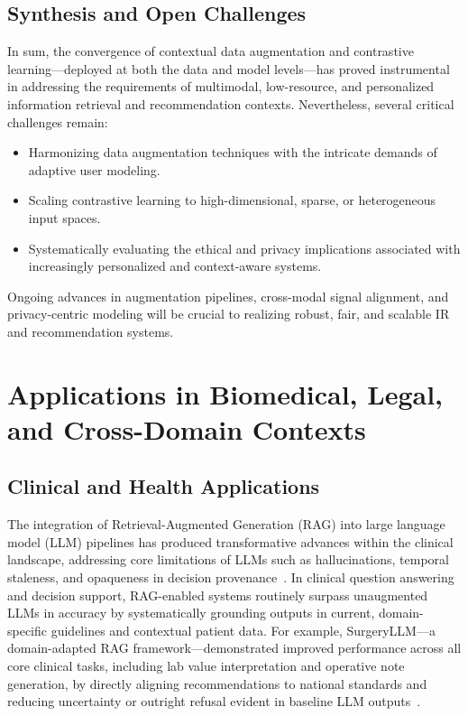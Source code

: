\subsection{Synthesis and Open Challenges}

In sum, the convergence of contextual data augmentation and contrastive learning—deployed at both the data and model levels—has proved instrumental in addressing the requirements of multimodal, low-resource, and personalized information retrieval and recommendation contexts. Nevertheless, several critical challenges remain:

\begin{itemize}
    \item Harmonizing data augmentation techniques with the intricate demands of adaptive user modeling.
    \item Scaling contrastive learning to high-dimensional, sparse, or heterogeneous input spaces.
    \item Systematically evaluating the ethical and privacy implications associated with increasingly personalized and context-aware systems.
\end{itemize}

Ongoing advances in augmentation pipelines, cross-modal signal alignment, and privacy-centric modeling will be crucial to realizing robust, fair, and scalable IR and recommendation systems.

\section{Applications in Biomedical, Legal, and Cross-Domain Contexts}

\subsection{Clinical and Health Applications}

The integration of Retrieval-Augmented Generation (RAG) into large language model (LLM) pipelines has produced transformative advances within the clinical landscape, addressing core limitations of LLMs such as hallucinations, temporal staleness, and opaqueness in decision provenance~\cite{ref1, ref2, ref3, ref5, ref6, ref7, ref8, ref29, ref30, ref31, ref42, ref48, ref52, ref53, ref54, ref55}. In clinical question answering and decision support, RAG-enabled systems routinely surpass unaugmented LLMs in accuracy by systematically grounding outputs in current, domain-specific guidelines and contextual patient data. For example, SurgeryLLM—a domain-adapted RAG framework—demonstrated improved performance across all core clinical tasks, including lab value interpretation and operative note generation, by directly aligning recommendations to national standards and reducing uncertainty or outright refusal evident in baseline LLM outputs~\cite{ref1}.

